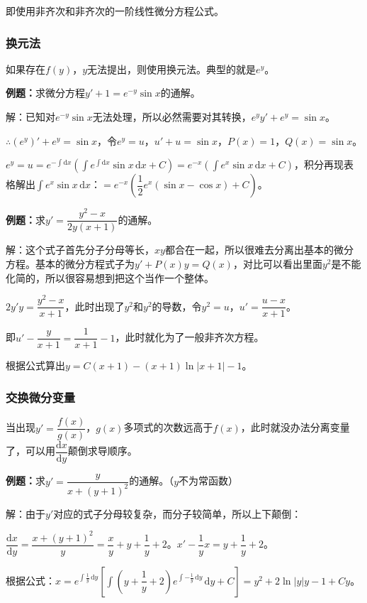\documentclass[UTF8, 12pt]{ctexart}
\begin{document}
即使用非齐次和非齐次的一阶线性微分方程公式。

\subsubsection{换元法}

如果存在$f(y)$，$y$无法提出，则使用换元法。典型的就是$e^y$。

\textbf{例题：}求微分方程$y'+1=e^{-y}\sin x$的通解。

解：已知对$e^{-y}\sin x$无法处理，所以必然需要对其转换，$e^yy'+e^y=\sin x$。

$\therefore(e^y)'+e^y=\sin x$，令$e^y=u$，$u'+u=\sin x$，$P(x)=1$，$Q(x)=\sin x$。

$e^y=u=e^{-\int\textrm{d}x}(\int e^{\int\textrm{d}x}\sin x\,\textrm{d}x+C)=e^{-x}(\int e^x\sin x\,\textrm{d}x+C)$，积分再现表格解出$\int e^x\sin x\,\textrm{d}x$：$=e^{-x}\left(\dfrac{1}{2}e^x(\sin x-\cos x)+C\right)$。

\textbf{例题：}求$y'=\dfrac{y^2-x}{2y(x+1)}$的通解。

解：这个式子首先分子分母等长，$xy$都合在一起，所以很难去分离出基本的微分方程。基本的微分方程式子为$y'+P(x)y=Q(x)$，对比可以看出里面$y^2$是不能化简的，所以很容易想到把这个当作一个整体。

$2y'y=\dfrac{y^2-x}{x+1}$，此时出现了$y^2$和$y^2$的导数，令$y^2=u$，$u'=\dfrac{u-x}{x+1}$。

即$u'-\dfrac{y}{x+1}=\dfrac{1}{x+1}-1$，此时就化为了一般非齐次方程。

根据公式算出$y=C(x+1)-(x+1)\ln\vert x+1\vert-1$。

\subsubsection{交换微分变量}

当出现$y'=\dfrac{f(x)}{g(x)}$，$g(x)$多项式的次数远高于$f(x)$，此时就没办法分离变量了，可以用$\dfrac{\textrm{d}x}{\textrm{d}y}$颠倒求导顺序。

\textbf{例题：}求$y'=\dfrac{y}{x+(y+1)^2}$的通解。（$y$不为常函数）

解：由于$y'$对应的式子分母较复杂，而分子较简单，所以上下颠倒：

$\dfrac{\textrm{d}x}{\textrm{d}y}=\dfrac{x+(y+1)^2}{y}=\dfrac{x}{y}+y+\dfrac{1}{y}+2$。$x'-\dfrac{1}{y}x=y+\dfrac{1}{y}+2$。

根据公式：$x=e^{\int\frac{1}{y}\,\textrm{d}y}\left[\displaystyle{\int\left(y+\dfrac{1}{y}+2\right)}e^{\int-\frac{1}{y}\,\textrm{d}y}\,\textrm{d}y+C\right]=y^2+2\ln\vert y\vert y-1+Cy$。
\end{document}
